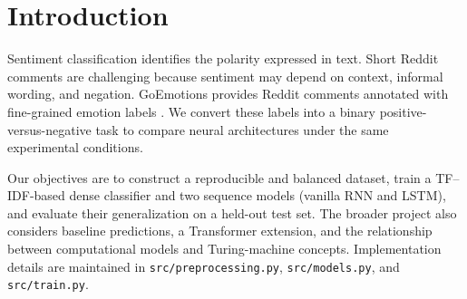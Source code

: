 \section{Introduction}
Sentiment classification identifies the polarity expressed in text. Short Reddit comments are challenging because sentiment may depend on context, informal wording, and negation. GoEmotions provides Reddit comments annotated with fine-grained emotion labels \cite{demszky2020goemotions}. We convert these labels into a binary positive-versus-negative task to compare neural architectures under the same experimental conditions.

Our objectives are to construct a reproducible and balanced dataset, train a TF--IDF-based dense classifier and two sequence models (vanilla RNN and LSTM), and evaluate their generalization on a held-out test set. The broader project also considers baseline predictions, a Transformer extension, and the relationship between computational models and Turing-machine concepts. Implementation details are maintained in \texttt{src/preprocessing.py}, \texttt{src/models.py}, and \texttt{src/train.py}.
